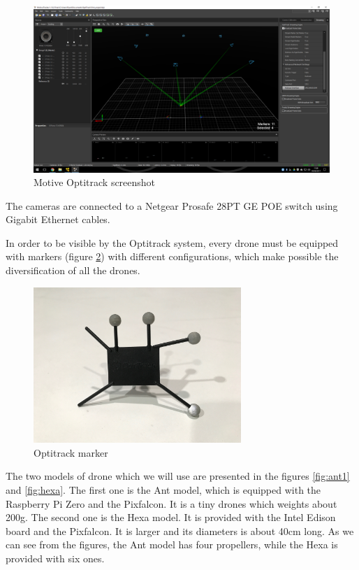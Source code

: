 \begin{figure}[h]
\centering
\includegraphics[width=1.0\textwidth]{chapters/chapter-03/figures/cameras_square.png}
\caption{Motive Optitrack screenshot}
\label{fig:camera_square}
\end{figure}

The cameras are connected to a Netgear Prosafe 28PT GE POE \cite{netgear} switch using
Gigabit Ethernet cables.

In order to be visible by the Optitrack system, every drone must be equipped with
markers (figure \ref{fig:marker}) with different configurations,
which make possible the diversification of all the drones.

\begin{figure}[h]
\centering
\includegraphics[width=0.7\textwidth]{chapters/chapter-03/figures/marker.jpg}
\caption{Optitrack marker}
\label{fig:marker}
\end{figure}

The two models of drone which we will use are presented in the figures \ref{fig:ant1}
and \ref{fig:hexa}. The first one is the Ant model, which is equipped with the Raspberry
Pi Zero and the Pixfalcon. It is a tiny drones which weights about 200g.
The second one is the Hexa model. It is provided with the Intel Edison board and
the Pixfalcon. It is larger and its diameters is about 40cm long.
As we can see from the figures, the Ant model has four propellers, while the Hexa
is provided with six ones.

